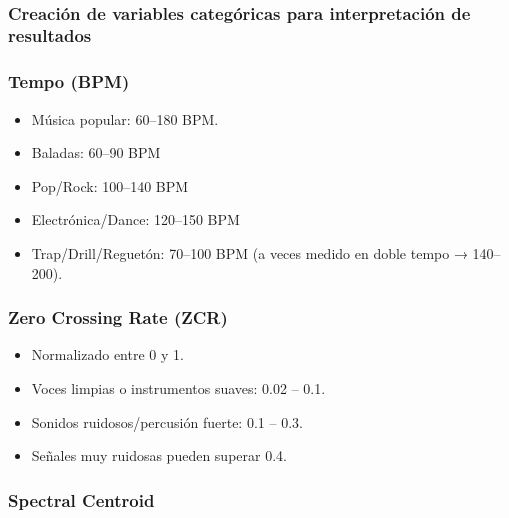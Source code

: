 \documentclass[11pt]{article}
\providecommand{\tightlist}{%
      \setlength{\itemsep}{0pt}\setlength{\parskip}{0pt}}
\begin{document}
    \begin{center}
    \end{center}
    { \hspace*{\fill} \\}
    
    \hypertarget{creaciuxf3n-de-variables-categuxf3ricas-para-interpretaciuxf3n-de-resultados}{%
\subsubsection{Creación de variables categóricas para interpretación de
resultados}\label{creaciuxf3n-de-variables-categuxf3ricas-para-interpretaciuxf3n-de-resultados}}

    \hypertarget{tempo-bpm}{%
\subsubsection{Tempo (BPM)}\label{tempo-bpm}}

\begin{itemize}
\tightlist
\item
  Música popular: 60--180 BPM.
\item
  Baladas: 60--90 BPM
\item
  Pop/Rock: 100--140 BPM
\item
  Electrónica/Dance: 120--150 BPM
\item
  Trap/Drill/Reguetón: 70--100 BPM (a veces medido en doble tempo →
  140--200).
\end{itemize}

\hypertarget{zero-crossing-rate-zcr}{%
\subsubsection{Zero Crossing Rate (ZCR)}\label{zero-crossing-rate-zcr}}

\begin{itemize}
\tightlist
\item
  Normalizado entre 0 y 1.
\item
  Voces limpias o instrumentos suaves: 0.02 -- 0.1.
\item
  Sonidos ruidosos/percusión fuerte: 0.1 -- 0.3.
\item
  Señales muy ruidosas pueden superar 0.4.
\end{itemize}

\hypertarget{spectral-centroid}{%
\subsubsection{Spectral Centroid}\label{spectral-centroid}}
\end{document}
